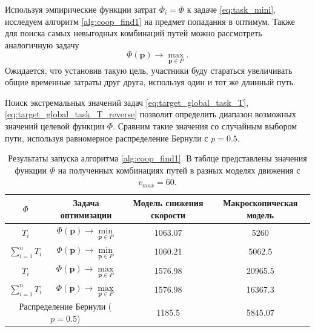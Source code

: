 \documentclass[12pt, a4paper]{article}
\begin{document}
Используя эмпирические функции затрат $\overline{\Phi}_i = \Phi$ к задаче \eqref{eq:task_mini}, исследуем алгоритм \ref{alg:coop_find1} на предмет попадания в оптимум. Также для поиска самых невыгодных комбинаций путей можно рассмотреть аналогичную задачу 
\begin{equation}
\label{eq:target_global_task_T_reverse}
\Phi (\textbf{p}) \rightarrow \max \limits_{\textbf{p} \in P}.
\end{equation}
Ожидается, что установив такую цель, участники буду стараться увеличивать общие временные затраты друг друга, используя один и тот же длинный путь. 

Поиск экстремальных значений задач \eqref{eq:target_global_task_T}, \eqref{eq:target_global_task_T_reverse} позволит определить диапазон возможных значений целевой функции $\Phi$. Сравним такие значения со случайным выбором пути, используя равномерное распределение Бернули с $p = 0.5$.

 
\begin{table}[H]
	\caption{Результаты запуска алгоритма \ref{alg:coop_find1}. В таблце представлены значения функции $\Phi$ на полученных комбинациях путей в разных моделях движения с $v_{max} = 60$.}
	\label{tab:res_average}
	\centering
	\begin{tabular}{|c|c|c|c|}
		\hline
		\multicolumn{1}{|c|}{ $\Phi$} & Задача оптимизации    & Модель снижения скорости & Макроскопическая модель \\ \hline
		\multicolumn{1}{|c|}{$T_i$}      & $\Phi (\textbf{p}) \rightarrow \min \limits_{\textbf{p} \in P}$ & 1063.07                  & 5260                    \\ \hline
		\multicolumn{1}{|c|}{$\sum\limits_{i = 1}^n T_i$} & $\Phi (\textbf{p}) \rightarrow \min \limits_{\textbf{p} \in P}$ & 1060.21                  & 5062.5                  \\ \hline
		\multicolumn{1}{|c|}{$T_i$ }      & $\Phi (\textbf{p}) \rightarrow \max \limits_{\textbf{p} \in P}$ & 1576.98                  & 20965.5                 \\ \hline
		\multicolumn{1}{|c|}{ $\sum\limits_{i = 1}^n T_i$} & $\Phi (\textbf{p}) \rightarrow \max \limits_{\textbf{p} \in P}$ & 1576.98                  & 16367.3                 \\ \hline
		\multicolumn{2}{|c|}{ Распределение Бернули ($p = 0.5$)}     & 1185.5                   & 5845.07                 \\ \hline
	\end{tabular}
\end{table}
\end{document}
